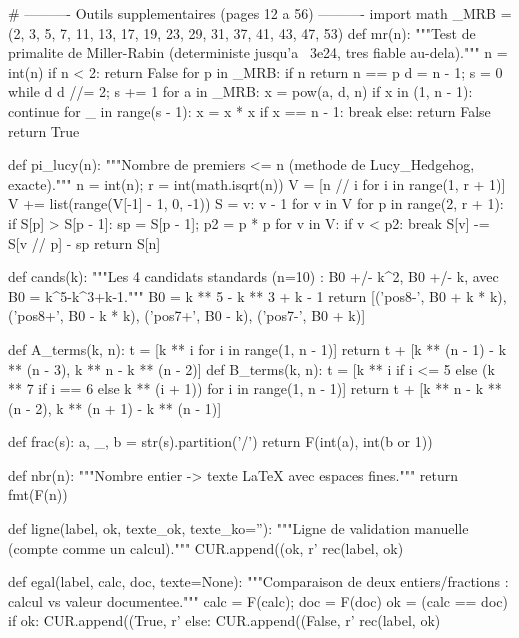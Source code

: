 \documentclass[11pt,a4paper]{article}
\begin{document}
\begin{pycode}
# ---------- Outils supplementaires (pages 12 a 56) ----------
import math
_MRB = (2, 3, 5, 7, 11, 13, 17, 19, 23, 29, 31, 37, 41, 43, 47, 53)
def mr(n):
    """Test de primalite de Miller-Rabin (deterministe jusqu'a ~3e24, tres fiable au-dela)."""
    n = int(n)
    if n < 2:
        return False
    for p in _MRB:
        if n %
            return n == p
    d = n - 1; s = 0
    while d %
        d //= 2; s += 1
    for a in _MRB:
        x = pow(a, d, n)
        if x in (1, n - 1):
            continue
        for _ in range(s - 1):
            x = x * x %
            if x == n - 1:
                break
        else:
            return False
    return True

def pi_lucy(n):
    """Nombre de premiers <= n (methode de Lucy_Hedgehog, exacte)."""
    n = int(n); r = int(math.isqrt(n))
    V = [n // i for i in range(1, r + 1)]
    V += list(range(V[-1] - 1, 0, -1))
    S = {v: v - 1 for v in V}
    for p in range(2, r + 1):
        if S[p] > S[p - 1]:
            sp = S[p - 1]; p2 = p * p
            for v in V:
                if v < p2:
                    break
                S[v] -= S[v // p] - sp
    return S[n]

def cands(k):
    """Les 4 candidats standards (n=10) : B0 +/- k^2, B0 +/- k, avec B0 = k^5-k^3+k-1."""
    B0 = k ** 5 - k ** 3 + k - 1
    return [('pos8-', B0 + k * k), ('pos8+', B0 - k * k), ('pos7+', B0 - k), ('pos7-', B0 + k)]

def A_terms(k, n):
    t = [k ** i for i in range(1, n - 1)]
    return t + [k ** (n - 1) - k ** (n - 3), k ** n - k ** (n - 2)]
def B_terms(k, n):
    t = [k ** i if i <= 5 else (k ** 7 if i == 6 else k ** (i + 1)) for i in range(1, n - 1)]
    return t + [k ** n - k ** (n - 2), k ** (n + 1) - k ** (n - 1)]

def frac(s):
    a, _, b = str(s).partition('/')
    return F(int(a), int(b or 1))

def nbr(n):
    """Nombre entier -> texte LaTeX avec espaces fines."""
    return fmt(F(n))

def ligne(label, ok, texte_ok, texte_ko=''):
    """Ligne de validation manuelle (compte comme un calcul)."""
    CUR.append((ok, r'%
    rec(label, ok)

def egal(label, calc, doc, texte=None):
    """Comparaison de deux entiers/fractions : calcul vs valeur documentee."""
    calc = F(calc); doc = F(doc)
    ok = (calc == doc)
    if ok:
        CUR.append((True, r'%
    else:
        CUR.append((False, r'%
    rec(label, ok)


\end{pycode}
\end{document}
